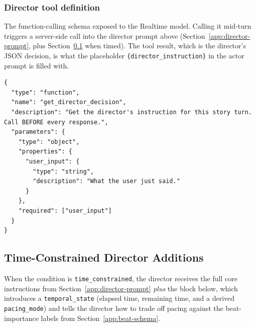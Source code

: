 \subsubsection{Director tool definition}
\label{app:director-tool}

The function-calling schema exposed to the Realtime model. Calling it mid-turn
triggers a server-side call into the director prompt above
(Section~\ref{app:director-prompt}, plus Section~\ref{app:time-constrained-prompt}
when timed). The tool result, which is the director's JSON decision, is what
the placeholder
\texttt{\{director\_instruction\}} in the actor prompt is filled with.

\begin{lstlisting}
{
  "type": "function",
  "name": "get_director_decision",
  "description": "Get the director's instruction for this story turn. Call BEFORE every response.",
  "parameters": {
    "type": "object",
    "properties": {
      "user_input": {
        "type": "string",
        "description": "What the user just said."
      }
    },
    "required": ["user_input"]
  }
}
\end{lstlisting}

\subsection{Time-Constrained Director Additions}
\label{app:time-constrained-prompt}

When the condition is \texttt{time\_constrained}, the director receives the
full core instructions from Section~\ref{app:director-prompt} \emph{plus}
the block below, which introduces a \texttt{temporal\_state} (elapsed time,
remaining time, and a derived \texttt{pacing\_mode}) and tells the director
how to trade off pacing against the beat-importance labels from
Section~\ref{app:beat-schema}.

